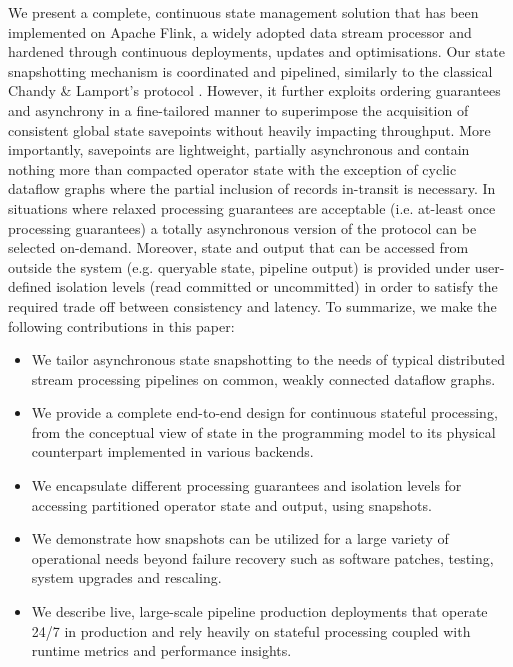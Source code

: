 We present a complete, continuous state management solution that has been implemented on Apache Flink, a widely adopted data stream processor and hardened through continuous deployments, updates and optimisations. Our state snapshotting mechanism is coordinated and pipelined, similarly to the classical Chandy \& Lamport's protocol \cite{chandy1985distributed}. However, it further exploits ordering guarantees and asynchrony in a fine-tailored manner to superimpose the acquisition of consistent global state savepoints without heavily impacting throughput. More importantly, savepoints are lightweight, partially asynchronous and contain nothing more than compacted operator state with the exception of cyclic dataflow graphs where the partial inclusion of records in-transit is necessary. In situations where relaxed processing guarantees are acceptable (i.e. at-least once processing guarantees) a totally asynchronous version of the protocol can be selected on-demand. Moreover, state and output that can be accessed from outside the system (e.g. queryable state, pipeline output) is provided under user-defined isolation levels (read committed or uncommitted) in order to satisfy the required trade off between consistency and latency. To summarize, we make the following contributions in this paper: 

\begin{itemize}
	\item We tailor asynchronous state snapshotting to the needs of typical distributed stream processing pipelines on common, weakly connected dataflow graphs.
	\item We provide a complete end-to-end design for continuous stateful processing, from the conceptual view of state in the programming model to its physical counterpart implemented in various backends.
	\item We encapsulate different processing guarantees and isolation levels for accessing partitioned operator state and output, using snapshots.
	\item We demonstrate how snapshots can be utilized for a large variety of operational needs beyond failure recovery such as software patches, testing, system upgrades and rescaling.
	\item We describe live, large-scale pipeline production deployments that operate 24/7 in production and rely heavily on stateful processing coupled with runtime metrics and performance insights.
\end{itemize}

